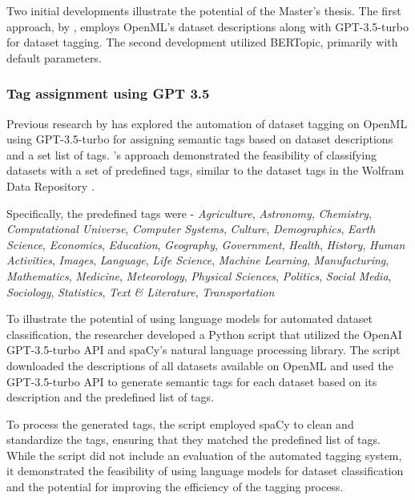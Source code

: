 \documentclass{article}
\begin{document}
Two initial developments illustrate the potential of the Master's thesis. The first approach, by \citeauthor{das_openmlscripts_nodate} \cite{das_openmlscripts_nodate}, employs OpenML's dataset descriptions along with GPT-3.5-turbo for dataset tagging. The second development utilized BERTopic, primarily with default parameters.

\subsubsection{Tag assignment using GPT 3.5}

Previous research by \citeauthor{das_openmlscripts_nodate} has explored the automation of dataset tagging on OpenML using GPT-3.5-turbo for assigning semantic tags based on dataset descriptions and a set list of tags. \citeauthor{das_openmlscripts_nodate}'s approach demonstrated the feasibility of classifying datasets with a set of predefined tags, similar to the dataset tags in the Wolfram Data Repository \cite{noauthor_wolfram_nodate}.

Specifically, the predefined tags were - \textit{Agriculture}, \textit{Astronomy}, \textit{Chemistry}, \textit{Computational Universe}, \textit{Computer Systems}, \textit{Culture}, \textit{Demographics}, \textit{Earth Science}, \textit{Economics}, \textit{Education}, \textit{Geography}, \textit{Government}, \textit{Health}, \textit{History}, \textit{Human Activities}, \textit{Images}, \textit{Language}, \textit{Life Science}, \textit{Machine Learning}, \textit{Manufacturing}, \textit{Mathematics}, \textit{Medicine}, \textit{Meteorology}, \textit{Physical Sciences}, \textit{Politics}, \textit{Social Media}, \textit{Sociology}, \textit{Statistics}, \textit{Text \& Literature}, \textit{Transportation}

To illustrate the potential of using language models for automated dataset classification, the researcher developed a Python script that utilized the OpenAI GPT-3.5-turbo API and spaCy's natural language processing library. The script downloaded the descriptions of all datasets available on OpenML and used the GPT-3.5-turbo API to generate semantic tags for each dataset based on its description and the predefined list of tags.

To process the generated tags, the script employed spaCy to clean and standardize the tags, ensuring that they matched the predefined list of tags. While the script did not include an evaluation of the automated tagging system, it demonstrated the feasibility of using language models for dataset classification and the potential for improving the efficiency of the tagging process.
\end{document}
